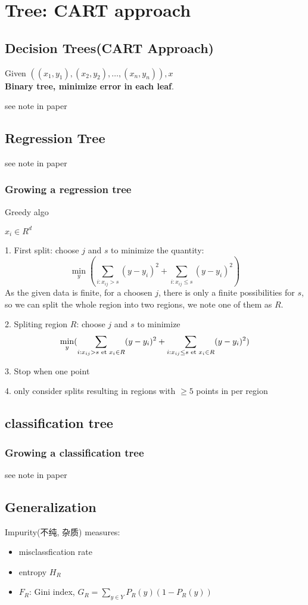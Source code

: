 \documentclass{article}
\begin{document}
\section{Tree: CART approach}
\subsection{Decision Trees(CART Approach)}
Given $((x_1, y_1), (x_2, y_2), \ldots, (x_n, y_n)), x$\\

\textbf{Binary tree, minimize error in each leaf}.

see note in paper

\subsection{Regression Tree}
see note in paper

\subsubsection{Growing a regression tree}
Greedy algo

$x_i \in R^d$

1. First split: choose $j$ and $s$ to minimize the quantity:
$$
\min_y (\sum_{i: x_{ij} > s} (y - y_i)^2 + \sum_{i: x_{ij} \leq s} (y - y_i)^2)
$$
As the given data is finite, for a choosen $j$, there is only a finite possibilities for $s$, \\
so we can split the whole region into two regions, we note one of them as $R$.

2. Spliting region $R$: choose $j$ and $s$ to minimize
$$
\min_y (\sum_{i: x_{ij} > s \textrm{\ et } x_i \in R} (y - y_i)^2 + \sum_{i: x_{ij} \leq s \textrm{\ et } x_i \in R} (y - y_i)^2)
$$

3. Stop when one point

4. only consider splits resulting in regions with $\geq 5$ points in per region

\subsection{classification tree}
\subsubsection{Growing a classification tree}
see note in paper

\subsection{Generalization}
Impurity(不纯, 杂质) measures:
\begin{itemize}
\item misclassfication rate
\item entropy $H_R$
\item $F_R$: Gini index, $G_R = \sum_{y \in Y} P_R(y)(1 - P_R(y))$
\end{itemize}
\end{document}
